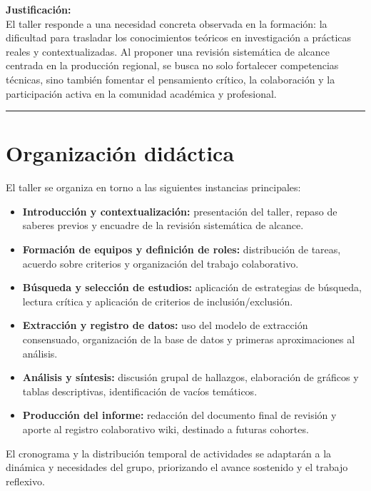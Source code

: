 \documentclass[
  letterpaper,
]{book}
\providecommand{\tightlist}{%
  \setlength{\itemsep}{0pt}\setlength{\parskip}{0pt}}\usepackage{longtable,booktabs,array}
\begin{document}
\textbf{Justificación:}\\
El taller responde a una necesidad concreta observada en la formación:
la dificultad para trasladar los conocimientos teóricos en investigación
a prácticas reales y contextualizadas. Al proponer una revisión
sistemática de alcance centrada en la producción regional, se busca no
solo fortalecer competencias técnicas, sino también fomentar el
pensamiento crítico, la colaboración y la participación activa en la
comunidad académica y profesional.

\begin{center}\rule{0.5\linewidth}{0.5pt}\end{center}

\section{Organización didáctica}\label{organizaciuxf3n-diduxe1ctica}

El taller se organiza en torno a las siguientes instancias principales:

\begin{itemize}
\tightlist
\item
  \textbf{Introducción y contextualización:} presentación del taller,
  repaso de saberes previos y encuadre de la revisión sistemática de
  alcance.
\item
  \textbf{Formación de equipos y definición de roles:} distribución de
  tareas, acuerdo sobre criterios y organización del trabajo
  colaborativo.
\item
  \textbf{Búsqueda y selección de estudios:} aplicación de estrategias
  de búsqueda, lectura crítica y aplicación de criterios de
  inclusión/exclusión.
\item
  \textbf{Extracción y registro de datos:} uso del modelo de extracción
  consensuado, organización de la base de datos y primeras
  aproximaciones al análisis.
\item
  \textbf{Análisis y síntesis:} discusión grupal de hallazgos,
  elaboración de gráficos y tablas descriptivas, identificación de
  vacíos temáticos.
\item
  \textbf{Producción del informe:} redacción del documento final de
  revisión y aporte al registro colaborativo wiki, destinado a futuras
  cohortes.
\end{itemize}

El cronograma y la distribución temporal de actividades se adaptarán a
la dinámica y necesidades del grupo, priorizando el avance sostenido y
el trabajo reflexivo.
\end{document}
